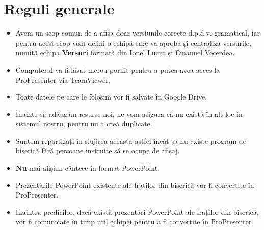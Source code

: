 \documentclass[epjST]{svjour}
\begin{document}
  \section{Reguli generale}
  \label{sec:2}
  \begin{itemize}
    \item Avem un scop comun de a afișa doar versiunile corecte d.p.d.v.
      gramatical, iar pentru acest scop vom defini o echipă care va aproba și centraliza
      versurile, numită echipa \textbf{Versuri} formată din Ionel Lucuț și Emanuel
      Vecerdea.

    \item Computerul va fi lăsat mereu pornit pentru a putea avea acces la ProPresenter
      via TeamViewer.

    \item Toate datele pe care le folosim vor fi salvate în Google Drive.

    \item Înainte să adăugăm resurse noi, ne vom asigura că nu există în alt loc
      în sistemul nostru, pentru nu a crea duplicate.

    \item Suntem repartizați în slujirea aceasta astfel încât să nu existe program
      de biserică fără persoane instruite să se ocupe de afișaj.

    \item \textbf{Nu} mai afișăm cântece în format PowerPoint.

    \item Prezentările PowerPoint existente ale fraților din biserică vor fi convertite
      în ProPresenter.

    \item Înaintea predicilor, dacă există prezentări PowerPoint ale fraților
      din biserică, vor fi comunicate în timp util echipei pentru a fi convertite
      în ProPresenter.
  \end{itemize}
\end{document}
